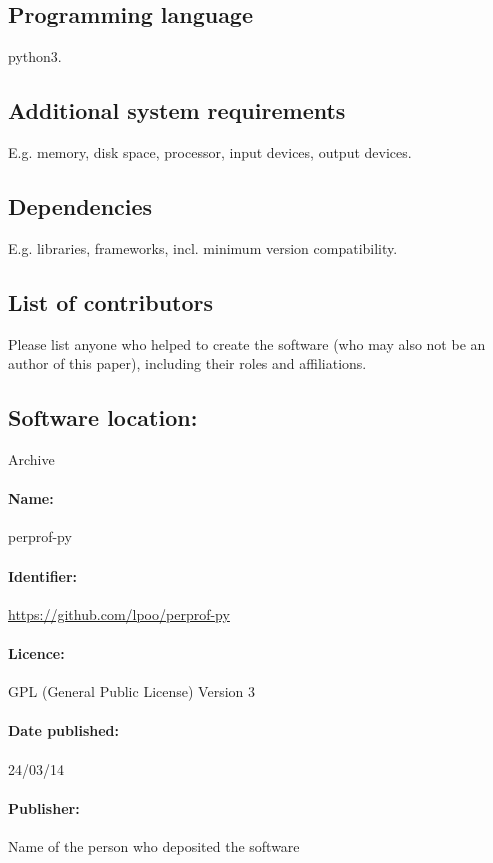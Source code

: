 \documentclass[10pt,a4paper]{article}
\begin{document}
\subsection*{Programming language}
python3.

\subsection*{Additional system requirements}
E.g. memory, disk space, processor, input devices, output devices.

\subsection*{Dependencies}
E.g. libraries, frameworks, incl. minimum version compatibility.

\subsection*{List of contributors}
Please list anyone who helped to create the software (who may also not be an author of this paper), including their roles and affiliations.

\subsection*{Software location:}
Archive  

\paragraph{Name:} perprof-py

\paragraph{Identifier:} \url{https://github.com/lpoo/perprof-py} 

\paragraph{Licence:} GPL (General Public License) Version 3

\paragraph{Date published:} 24/03/14

\paragraph{Publisher:} Name of the person who deposited the software
\end{document}
